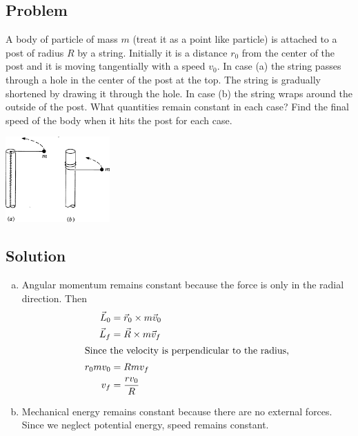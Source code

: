 \documentclass[solutions]{esg8012pset}
\begin{document}
\subsection{Problem}
  A body of particle of mass $m$ (treat it as a point like particle) is attached to a post of radius $R$ by a string. Initially it is a distance $r_0$ from the center of the post and it is moving tangentially with a speed $v_0$. In case (a) the string passes through a hole in the center of the post at the top. The string is gradually shortened by drawing it through the hole. In case (b) the string wraps around the outside of the post. What quantities remain constant in each case? Find the final speed of the body when it hits the post for each case.
  \begin{center}\includegraphics[width=0.3\textwidth]{ps08_5}\end{center}
\subsection{Solution}
  \begin{enumerate}[(a)]
    \item Angular momentum remains constant because the force is only in the radial direction.  Then \begin{align*}
      \vec L_0 & = \vec r_0 \times m \vec v_0 \\
      \vec L_f & = \vec R \times m\vec v_f \\
      \intertext{Since the velocity is perpendicular to the radius,}
      r_0 m v_0 & = R m v_f \\
      v_f & = \frac{r v_0}{R}
    \end{align*}
    \item Mechanical energy remains constant because there are no external forces.  Since we neglect potential energy, speed remains constant.
  \end{enumerate}
\end{document}
